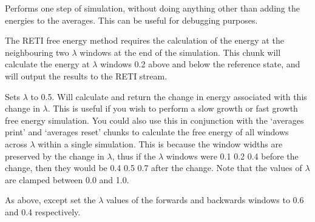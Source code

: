 \documentclass[letterpaper,10pt,english]{sphinxmanual}
\begin{document}
Performs one step of simulation, without doing anything other than adding the energies to the averages. This can be useful for debugging purposes.

\ignorespaces 
\def\sphinxLiteralBlockLabel{\label{\detokenize{protoms:index-85}}}
%
\begin{sphinxVerbatim}[commandchars=\\\{\}]
  
\end{sphinxVerbatim}

The RETI free energy method requires the calculation of the energy at the neighbouring two \(\lambda\) windows at the end of the simulation. This chunk will calculate the energy at \(\lambda\) windows 0.2 above and below the reference state, and will output the results to the RETI stream.

\ignorespaces 
\def\sphinxLiteralBlockLabel{\label{\detokenize{protoms:index-86}}}
%
\begin{sphinxVerbatim}[commandchars=\\\{\}]
  
\end{sphinxVerbatim}

Sets \(\lambda\) to 0.5. Will calculate and return the change in energy associated with this change in \(\lambda\). This is useful if you wish to perform a slow growth or fast growth free energy simulation. You could also use this in conjunction with the ‘averages print’ and ‘averages reset’ chunks to calculate the free energy of all windows across \(\lambda\) within a single simulation. This is because the window widths are preserved by the change in \(\lambda\), thus if the \(\lambda\) windows were 0.1 0.2 0.4 before the change, then they would be 0.4 0.5 0.7 after the change. Note that the values of \(\lambda\) are clamped between 0.0 and 1.0.

%
\begin{sphinxVerbatim}[commandchars=\\\{\}]
    
\end{sphinxVerbatim}

As above, except set the \(\lambda\) values of the forwards and backwards windows to 0.6 and 0.4 respectively.

%
\begin{sphinxVerbatim}[commandchars=\\\{\}]
   
\end{sphinxVerbatim}
\end{document}
